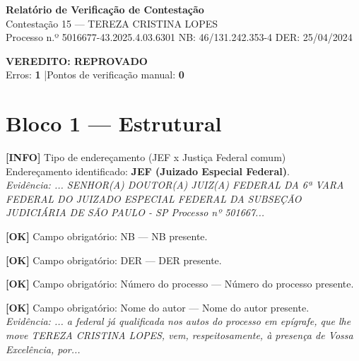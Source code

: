 \documentclass[12pt,a4paper]{article}
\newcommand{\statusOK}[1]{\textcolor{corOK}{\textbf{[OK]}} #1}
\newcommand{\statusINFO}[1]{\textcolor{corINFO}{\textbf{[INFO]}} #1}
\begin{document}
\begin{center}
  {\LARGE \textbf{Relatório de Verificação de Contestação}}\\[0.4em]
  {\large Contestação 15 --- TEREZA CRISTINA LOPES}\\[0.2em]
  {\small Processo n.º 5016677-43.2025.4.03.6301 \quad NB: 46/131.242.353-4 \quad DER: 25/04/2024}
\end{center}

\vspace{0.5em}

\noindent\colorbox{corFundoReprovado}{%
  \begin{minipage}{\dimexpr\linewidth-2\fboxsep}
    \centering
    \vspace{0.3em}
    {\large \textcolor{corERRO}{\textbf{VEREDITO: REPROVADO}}}\\
    Erros: \textbf{1} \quad|\quad Pontos de verificação manual: \textbf{0}
    \vspace{0.3em}
  \end{minipage}%
}

\vspace{1em}


\section{Bloco 1 --- Estrutural}

\statusINFO{Tipo de endereçamento (JEF x Justiça Federal comum)}\\
Endereçamento identificado: \textbf{JEF (Juizado Especial Federal)}.\\
\textit{Evidência: ... SENHOR(A) DOUTOR(A) JUIZ(A) FEDERAL DA 6ª VARA FEDERAL DO JUIZADO ESPECIAL FEDERAL DA SUBSEÇÃO JUDICIÁRIA DE SÃO PAULO - SP Processo nº 501667...}

\medskip
\statusOK{Campo obrigatório: NB} --- NB presente.

\medskip
\statusOK{Campo obrigatório: DER} --- DER presente.

\medskip
\statusOK{Campo obrigatório: Número do processo} --- Número do processo presente.

\medskip
\statusOK{Campo obrigatório: Nome do autor} --- Nome do autor presente.\\
\textit{Evidência: ... a federal já qualificada nos autos do processo em epígrafe, que lhe move TEREZA CRISTINA LOPES, vem, respeitosamente, à presença de Vossa Excelência, por...}
\end{document}
